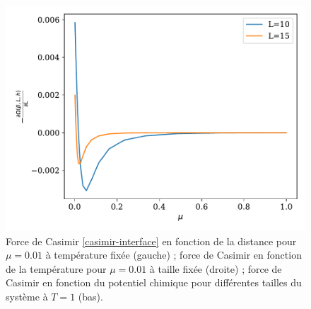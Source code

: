 \begin{figure}[t]
\begin{minipage}[t]{0.4\linewidth}
	\end{minipage}
	\centering
	\begin{minipage}[b]{0.4\linewidth}
    	\includegraphics[width=\linewidth]{chap4/casimir-mu-t1.pdf}
	\end{minipage}	
	\label{casimir-temperature}
	\caption{Force de Casimir \ref{casimir-interface} en fonction de la distance pour $\mu = 0.01$ à température fixée (gauche) ; force de Casimir en fonction de la température pour $\mu=0.01$ à taille fixée (droite) ; force de Casimir en fonction du potentiel chimique pour différentes tailles du système à $T=1$ (bas). }
\end{figure}
    
